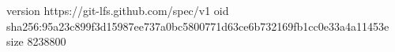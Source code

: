 version https://git-lfs.github.com/spec/v1
oid sha256:95a23c899f3d15987ee737a0bc5800771d63ce6b732169fb1cc0e33a4a11453e
size 8238800

